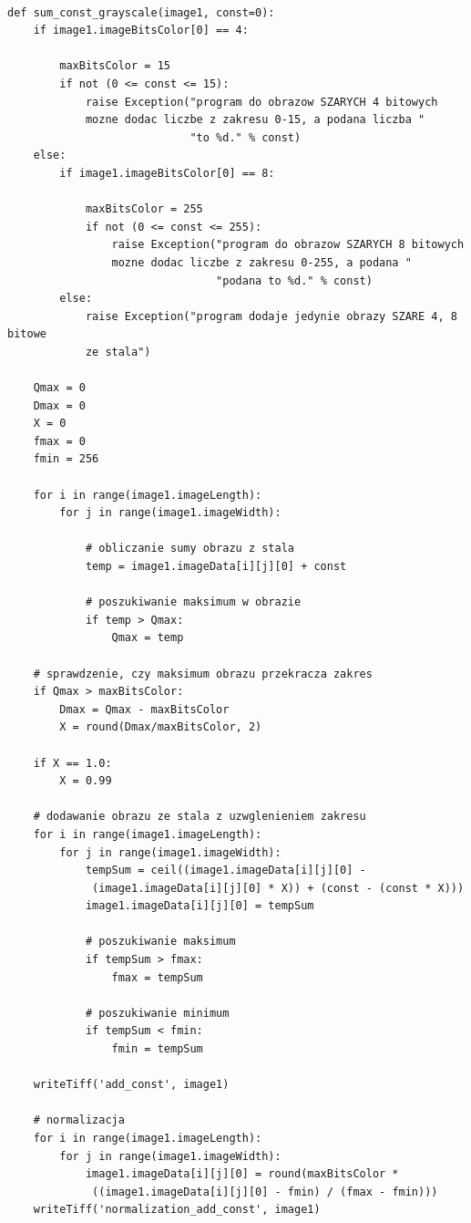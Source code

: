 \documentclass[magisterska,openany]{pracadypl}
\begin{document}
\lstset{language=Python}
\vspace{0.25cm}
\begin{lstlisting}[caption={Sumowanie (okreslonej) stałej z obrazem szarym}]

def sum_const_grayscale(image1, const=0):
    if image1.imageBitsColor[0] == 4:

        maxBitsColor = 15
        if not (0 <= const <= 15):
            raise Exception("program do obrazow SZARYCH 4 bitowych 
            mozne dodac liczbe z zakresu 0-15, a podana liczba "
                            "to %d." % const)
    else:
        if image1.imageBitsColor[0] == 8:

            maxBitsColor = 255
            if not (0 <= const <= 255):
                raise Exception("program do obrazow SZARYCH 8 bitowych 
                mozne dodac liczbe z zakresu 0-255, a podana "
                                "podana to %d." % const)
        else:
            raise Exception("program dodaje jedynie obrazy SZARE 4, 8 bitowe
            ze stala")

    Qmax = 0
    Dmax = 0
    X = 0
    fmax = 0
    fmin = 256

    for i in range(image1.imageLength):
        for j in range(image1.imageWidth):

            # obliczanie sumy obrazu z stala
            temp = image1.imageData[i][j][0] + const

            # poszukiwanie maksimum w obrazie
            if temp > Qmax:
                Qmax = temp

    # sprawdzenie, czy maksimum obrazu przekracza zakres
    if Qmax > maxBitsColor:
        Dmax = Qmax - maxBitsColor
        X = round(Dmax/maxBitsColor, 2)

    if X == 1.0:
        X = 0.99

    # dodawanie obrazu ze stala z uzwglenieniem zakresu
    for i in range(image1.imageLength):
        for j in range(image1.imageWidth):
            tempSum = ceil((image1.imageData[i][j][0] -
             (image1.imageData[i][j][0] * X)) + (const - (const * X)))
            image1.imageData[i][j][0] = tempSum

            # poszukiwanie maksimum
            if tempSum > fmax:
                fmax = tempSum

            # poszukiwanie minimum
            if tempSum < fmin:
                fmin = tempSum

    writeTiff('add_const', image1)

    # normalizacja
    for i in range(image1.imageLength):
        for j in range(image1.imageWidth):
            image1.imageData[i][j][0] = round(maxBitsColor *
             ((image1.imageData[i][j][0] - fmin) / (fmax - fmin)))
    writeTiff('normalization_add_const', image1)

\end{lstlisting}
\end{document}
